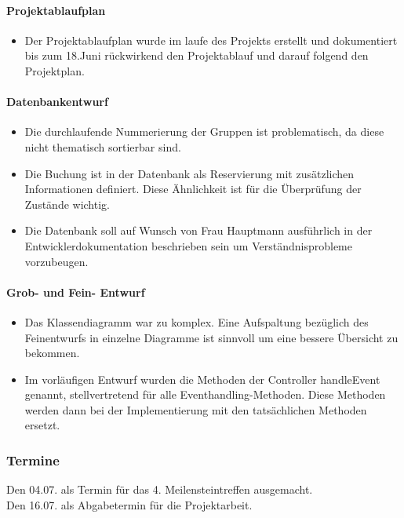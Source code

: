 \paragraph{Projektablaufplan}
\begin{itemize}
\item Der Projektablaufplan wurde im laufe des Projekts erstellt und dokumentiert bis zum 18.Juni rückwirkend den Projektablauf und darauf folgend den Projektplan.
\end{itemize}

\paragraph{Datenbankentwurf}
\begin{itemize}
\item Die durchlaufende Nummerierung der Gruppen ist problematisch, da diese nicht thematisch sortierbar sind.
\item Die Buchung ist in der Datenbank als Reservierung mit zusätzlichen Informationen definiert. Diese Ähnlichkeit ist für die Überprüfung der Zustände wichtig.
\item Die Datenbank soll auf Wunsch von Frau Hauptmann ausführlich in der Entwicklerdokumentation beschrieben sein um Verständnisprobleme vorzubeugen.
\end{itemize}

\paragraph{Grob- und Fein- Entwurf}
\begin{itemize}
\item Das Klassendiagramm war zu komplex. Eine Aufspaltung bezüglich des Feinentwurfs in einzelne Diagramme ist sinnvoll um eine bessere Übersicht zu bekommen. 
\item Im vorläufigen Entwurf wurden die Methoden der Controller handleEvent genannt, stellvertretend für alle Eventhandling-Methoden. Diese Methoden werden dann bei der Implementierung mit den tatsächlichen Methoden ersetzt.
\end{itemize}

\subsubsection{Termine}

Den 04.07. als Termin für das 4. Meilensteintreffen ausgemacht.
\\Den 16.07. als Abgabetermin für die Projektarbeit.


